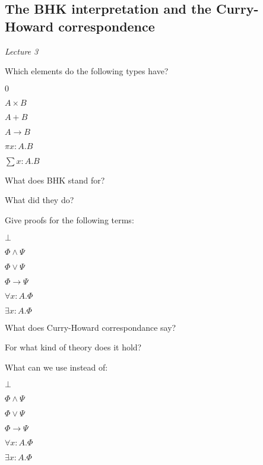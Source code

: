 \documentclass[fleqn]{article}
\begin{document}
\subsection{The BHK interpretation and the Curry-Howard correspondence}
\textit{Lecture 3}
\begin{enumerate}
    \item Which elements do the following types have?
    \begin{itemize}
        \item $0$
        \item $A \times B$
        {\color{red}\item $A + B$}
        {\color{red}\item $A \rightarrow B$}
        {\color{blue}\item $\pi x: A.B$}
        {\color{red}\item $\sum x: A.B$}
    \end{itemize}
    {\color{green}\item What does BHK stand for?}
    {\color{red}\item What did they do?}
    {\color{red}\item Give proofs for the following terms:}
    \begin{itemize}
        {\color{red}\item $\bot$}
        {\color{green}\item $\Phi \wedge \Psi$}
        \item $\Phi \vee \Psi$
        {\color{red}\item $\Phi \rightarrow \Psi$}
        {\color{blue}\item $\forall x : A. \Phi$}
        {\color{blue}\item $\exists x: A. \Phi$}
    \end{itemize}
    {\color{red}\item What does Curry-Howard correspondance say?}
    {\color{red}\item For what kind of theory does it hold?}
    \item What can we use instead of:
    \begin{itemize}
        \item $\bot$
        \item $\Phi \wedge \Psi$
        \item $\Phi \vee \Psi$
        \item $\Phi \rightarrow \Psi$
        {\color{red}\item $\forall x : A. \Phi$}
        {\color{red}\item $\exists x: A. \Phi$}

\end{itemize}
\end{enumerate}
\end{document}
